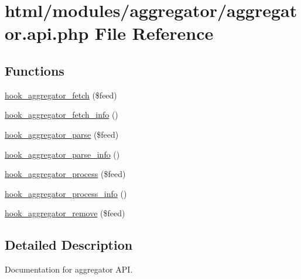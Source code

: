 \hypertarget{aggregator_8api_8php}{
\section{html/modules/aggregator/aggregator.api.php File Reference}
\label{aggregator_8api_8php}
}
\subsection*{Functions}
\begin{DoxyCompactItemize}
\item 
\hyperlink{group__hooks_ga459db08cc062e9ea3bf1f526daf91a4a}{hook\_\-aggregator\_\-fetch} (\$feed)
\item 
\hyperlink{group__hooks_gaa9eb0b672b7f66eb5aaccf27e8ff995f}{hook\_\-aggregator\_\-fetch\_\-info} ()
\item 
\hyperlink{group__hooks_gae27163e729bb531cc527ec6f0ad16943}{hook\_\-aggregator\_\-parse} (\$feed)
\item 
\hyperlink{group__hooks_ga4cf79b336cf009dee9487ae9d2249d9d}{hook\_\-aggregator\_\-parse\_\-info} ()
\item 
\hyperlink{group__hooks_gaf5da0f420ab3b27c1bc33f339c979ac7}{hook\_\-aggregator\_\-process} (\$feed)
\item 
\hyperlink{group__hooks_gae616ac385e5ff114031dc2dc88413e32}{hook\_\-aggregator\_\-process\_\-info} ()
\item 
\hyperlink{group__hooks_gaf2f3e401371efb540b050208df5400eb}{hook\_\-aggregator\_\-remove} (\$feed)
\end{DoxyCompactItemize}


\subsection{Detailed Description}
Documentation for aggregator API. 